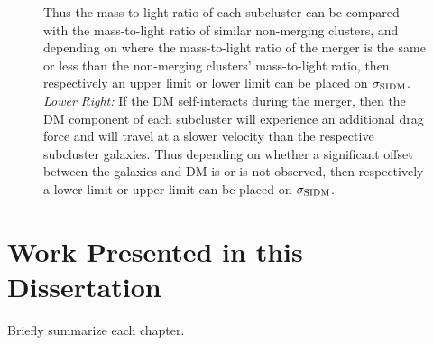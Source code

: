\begin{figure}
{Thus the mass-to-light ratio of each subcluster can be compared with the mass-to-light ratio of similar non-merging clusters, and depending on where the mass-to-light ratio of the merger is the same or less than the non-merging clusters' mass-to-light ratio, then respectively an upper limit or lower limit can be placed on $\sigma_{\rm SIDM}$.
\emph{Lower Right:} If the DM self-interacts during the merger, then the DM component of each subcluster will experience an additional drag force and will travel at a slower velocity than the respective subcluster galaxies.
Thus depending on whether a significant offset between the galaxies and DM is or is not observed, then respectively a lower limit or upper limit can be placed on $\sigma_{\rm SIDM}$.
\label{fig:4ConstraintMethods}}
\end{figure}

\section{Work Presented in this Dissertation}
Briefly summarize each chapter.